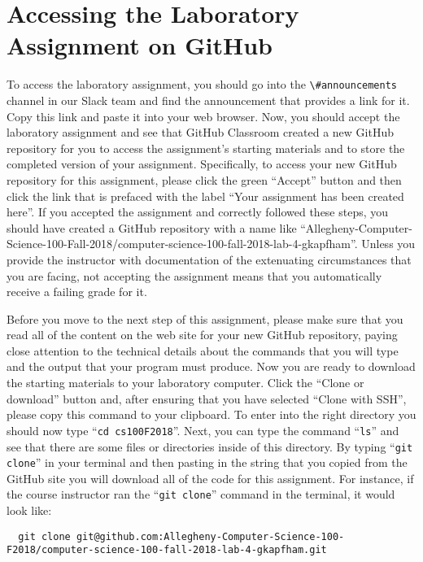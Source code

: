 \documentclass[11pt]{article}
\newcommand{\command}[1]{``\lstinline{#1}''}
\newcommand{\channel}[1]{\lstinline{#1}}
\begin{document}
\section*{Accessing the Laboratory Assignment on GitHub}

To access the laboratory assignment, you should go into the \channel{\#announcements} channel in our Slack team and find
the announcement that provides a link for it. Copy this link and paste it into your web browser. Now, you should accept
the laboratory assignment and see that GitHub Classroom created a new GitHub repository for you to access the
assignment's starting materials and to store the completed version of your assignment. Specifically, to access your new
GitHub repository for this assignment, please click the green ``Accept'' button and then click the link that is prefaced
with the label ``Your assignment has been created here''. If you accepted the assignment and correctly followed these
steps, you should have created a GitHub repository with a name like
``Allegheny-Computer-Science-100-Fall-2018/computer-science-100-fall-2018-lab-4-gkapfham''. Unless you provide the
instructor with documentation of the extenuating circumstances that you are facing, not accepting the assignment means
that you automatically receive a failing grade for it.

Before you move to the next step of this assignment, please make sure that you read all of the content on the web site
for your new GitHub repository, paying close attention to the technical details about the commands that you will type
and the output that your program must produce. Now you are ready to download the starting materials to your laboratory
computer. Click the ``Clone or download'' button and, after ensuring that you have selected ``Clone with SSH'', please
copy this command to your clipboard. To enter into the right directory you should now type \command{cd cs100F2018}.
Next, you can type the command \command{ls} and see that there are some files or directories inside of this directory.
By typing \command{git clone} in your terminal and then pasting in the string that you copied from the GitHub site you
will download all of the code for this assignment. For instance, if the course instructor ran the \command{git clone}
command in the terminal, it would look like:

\begin{lstlisting}
  git clone git@github.com:Allegheny-Computer-Science-100-F2018/computer-science-100-fall-2018-lab-4-gkapfham.git
\end{lstlisting}
\end{document}

